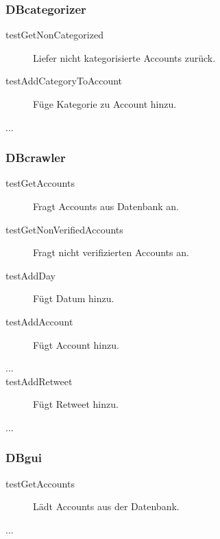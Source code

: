 \subsubsection{DBcategorizer}
\quad
\begin{description}
	\item[testGetNonCategorized] Liefer nicht kategorisierte Accounts zurück.
	\item[testAddCategoryToAccount] Füge Kategorie zu Account hinzu.
	\item[...]
\end{description}
\subsubsection{DBcrawler}
\begin{description}
	\item[testGetAccounts] Fragt Accounts aus Datenbank an.
	\item[testGetNonVerifiedAccounts] Fragt nicht verifizierten Accounts an.
	\item[testAddDay] Fügt Datum hinzu.
	\item[testAddAccount] Fügt Account hinzu.
	\item[...]
	\item[testAddRetweet] Fügt Retweet hinzu.
	\item[...]	
\end{description}
\subsubsection{DBgui}
\begin{description}
	\item [testGetAccounts] Lädt Accounts aus der Datenbank.
	\item [...]
\end{description}
\quad



